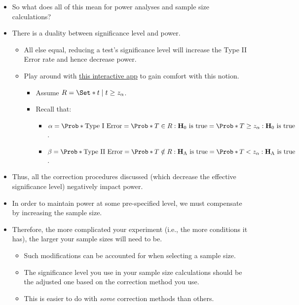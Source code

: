 \begin{itemize}
    \item So what does all of this mean for power analyses and sample size calculations?
    \item There is a duality between significance level and power.
          \begin{itemize}
              \item All else equal, reducing a test's significance level will increase the Type II Error rate and hence
                    decrease power.
              \item Play around with \href{https://nathaniel-t-stevens.shinyapps.io/ErrorIllustrator/}{this interactive app} to gain comfort with this notion.
                    \begin{itemize}
                        \item Assume $ \mathcal{R}=\Set*{t\mid t\ge z_\alpha} $.
                        \item Recall that: \begin{itemize}
                                  \item $ \alpha=\Prob*{\text{Type I Error}}=\Prob*{T\in\mathcal{R}\given \text{$ \mathbf{H}_0 $ is true}}=\Prob*{T\ge z_\alpha\given \text{$ \mathbf{H}_0 $ is true}}$.
                                  \item $ \beta=\Prob*{\text{Type II Error}}=\Prob*{T\notin\mathcal{R}\given \text{$ \mathbf{H}_\text{A} $ is true}}=\Prob*{T< z_\alpha\given \text{$ \mathbf{H}_\text{A} $ is true}} $.
                              \end{itemize}
                    \end{itemize}
          \end{itemize}
    \item Thus, all the correction procedures discussed (which decrease the effective significance level)
          negatively impact power.
    \item In order to maintain power at some pre-specified level, we must compensate by increasing the sample
          size.
    \item Therefore, the more complicated your experiment (i.e., the more conditions it has), the larger your
          sample sizes will need to be.
          \begin{itemize}
              \item Such modifications can be accounted for when selecting a sample size.
              \item The significance level you use in your sample size calculations should be the adjusted one based
                    on the correction method you use.
              \item This is easier to do with \emph{some} correction methods than others.
          \end{itemize}
\end{itemize}
